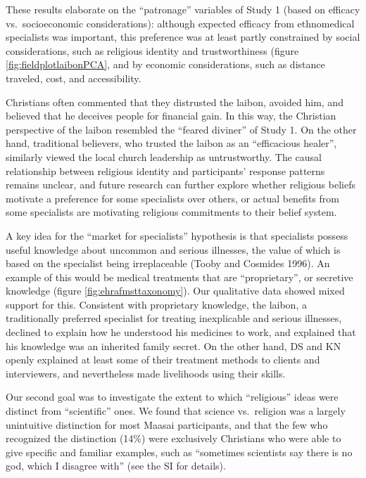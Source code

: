 \documentclass[
  11pt,
]{article}
\begin{document}
These results elaborate on the ``patronage'' variables of Study 1 (based on efficacy vs.~socioeconomic considerations): although expected efficacy from ethnomedical specialists was important, this preference was at least partly constrained by social considerations, such as religious identity and trustworthiness (figure \ref{fig:fieldplotlaibonPCA}, and by economic considerations, such as distance traveled, cost, and accessibility.

Christians often commented that they distrusted the laibon, avoided him, and believed that he deceives people for financial gain. In this way, the Christian perspective of the laibon resembled the ``feared diviner'' of Study 1. On the other hand, traditional believers, who trusted the laibon as an ``efficacious healer'', similarly viewed the local church leadership as untrustworthy. The causal relationship between religious identity and participants' response patterns remains unclear, and future research can further explore whether religious beliefs motivate a preference for some specialists over others, or actual benefits from some specialists are motivating religious commitments to their belief system.

A key idea for the ``market for specialists'' hypothesis is that specialists possess useful knowledge about uncommon and serious illnesses, the value of which is based on the specialist being irreplaceable (Tooby and Cosmides 1996). An example of this would be medical treatments that are ``proprietary'', or secretive knowledge (figure \ref{fig:ehrafmsttaxonomy}). Our qualitative data showed mixed support for this. Consistent with proprietary knowledge, the laibon, a traditionally preferred specialist for treating inexplicable and serious illnesses, declined to explain how he understood his medicines to work, and explained that his knowledge was an inherited family secret. On the other hand, DS and KN openly explained at least some of their treatment methods to clients and interviewers, and nevertheless made livelihoods using their skills.

Our second goal was to investigate the extent to which ``religious'' ideas were distinct from ``scientific'' ones. We found that science vs.~religion was a largely unintuitive distinction for most Maasai participants, and that the few who recognized the distinction (14\%) were exclusively Christians who were able to give specific and familiar examples, such as ``sometimes scientists say there is no god, which I disagree with'' (see the SI for details).
\end{document}
